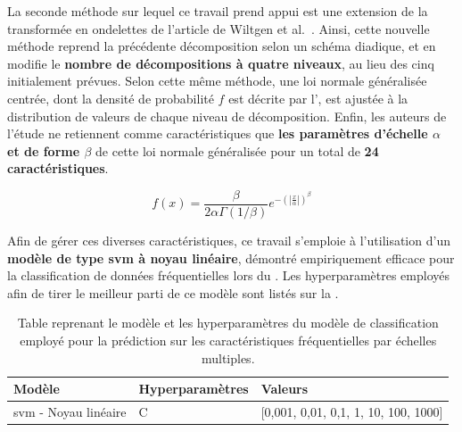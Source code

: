 La seconde méthode sur lequel ce travail prend appui est une extension de la transformée en ondelettes de l'article de Wiltgen et al.~\cite{Halimi2017a}. Ainsi, cette nouvelle méthode reprend la précédente décomposition selon un schéma diadique, et en modifie le \textbf{nombre de décompositions à quatre niveaux}, au lieu des cinq initialement prévues. Selon cette même méthode, une loi normale généralisée centrée, dont la densité de probabilité $f$ est décrite par l', est ajustée à la distribution de valeurs de chaque niveau de décomposition. Enfin, les auteurs de l'étude ne retiennent comme caractéristiques que \textbf{les paramètres d'échelle $\alpha$ et de forme $\beta$} de cette loi normale généralisée pour un total de \textbf{24 caractéristiques}.\par

\begin{equation}
    f(x)= \frac{\beta}{2\alpha\Gamma(1/\beta)} e^{-\left(|\frac{x}{\alpha}|\right)^\beta}
    \label{eq:image_improvement_ggd}
\end{equation}

Afin de gérer ces diverses caractéristiques, ce travail s'emploie à l'utilisation d'un \textbf{modèle de type \gls{svm} à noyau linéaire}, démontré empiriquement efficace pour la classification de données fréquentielles lors du . Les hyperparamètres employés afin de tirer le meilleur parti de ce modèle sont listés sur la .\par

\begin{table}[H]
    \centering
    \begin{tabular}{lll}
        \toprule
        \textbf{Modèle}                                 & \textbf{Hyperparamètres}  & \textbf{Valeurs}                          \\ \midrule
        \gls{svm} - Noyau linéaire                      & C                         & [0,001, 0,01, 0,1, 1, 10, 100, 1000]      \\ 
        \bottomrule 
    \end{tabular} 
    \caption{Table reprenant le modèle et les hyperparamètres du modèle de classification employé pour la prédiction sur les caractéristiques fréquentielles par échelles multiples.}
    \label{tab:parameters_image_improvement_multiscale_frequency}
\end{table}\par

